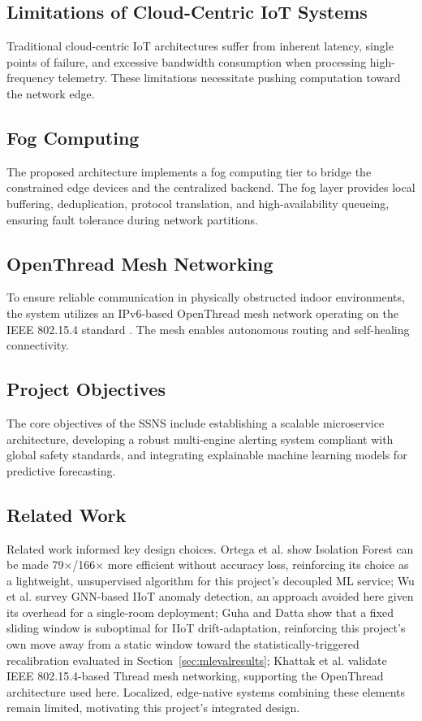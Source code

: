 \documentclass[conference]{IEEEtran}
\begin{document}
\subsection{Limitations of Cloud-Centric IoT Systems}
Traditional cloud-centric IoT architectures suffer from inherent latency, single points of failure, and excessive bandwidth consumption when processing high-frequency telemetry. These limitations necessitate pushing computation toward the network edge.

\subsection{Fog Computing}
The proposed architecture implements a fog computing tier to bridge the constrained edge devices and the centralized backend. The fog layer provides local buffering, deduplication, protocol translation, and high-availability queueing, ensuring fault tolerance during network partitions.

\subsection{OpenThread Mesh Networking}
\label{sec:intro-thread}
To ensure reliable communication in physically obstructed indoor environments, the system utilizes an IPv6-based OpenThread mesh network operating on the IEEE 802.15.4 standard \cite{b10}. The mesh enables autonomous routing and self-healing connectivity.

\subsection{Project Objectives}
The core objectives of the SSNS include establishing a scalable microservice architecture, developing a robust multi-engine alerting system compliant with global safety standards, and integrating explainable machine learning models for predictive forecasting.

\subsection{Related Work}
Related work informed key design choices. Ortega et al. \cite{b16} show Isolation Forest can be made 79$\times$/166$\times$ more efficient without accuracy loss, reinforcing its choice as a lightweight, unsupervised algorithm for this project's decoupled ML service; Wu et al. \cite{b17} survey GNN-based IIoT anomaly detection, an approach avoided here given its overhead for a single-room deployment; Guha and Datta \cite{b18} show that a fixed sliding window is suboptimal for IIoT drift-adaptation, reinforcing this project's own move away from a static window toward the statistically-triggered recalibration evaluated in Section~\ref{sec:mlevalresults}; Khattak et al. \cite{b19} validate IEEE 802.15.4-based Thread mesh networking, supporting the OpenThread architecture used here. Localized, edge-native systems combining these elements remain limited, motivating this project's integrated design.
\end{document}
